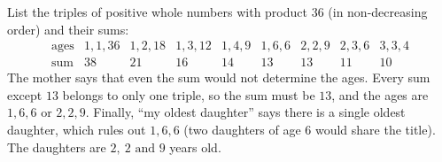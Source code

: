 List the triples of positive whole numbers with product $36$ (in non-decreasing order) and their sums:
\[
\begin{array}{c|cccccccc}
\text{ages}&1,1,36&1,2,18&1,3,12&1,4,9&1,6,6&2,2,9&2,3,6&3,3,4\\\hline
\text{sum}&38&21&16&14&13&13&11&10
\end{array}
\]
The mother says that even the sum would not determine the ages. Every sum except $13$ belongs to only one triple, so the sum must be $13$, and the ages are $1,6,6$ or $2,2,9$. Finally, ``my oldest daughter'' says there is a single oldest daughter, which rules out $1,6,6$ (two daughters of age $6$ would share the title). The daughters are $\boxed{2,\ 2\text{ and }9}$ years old.
